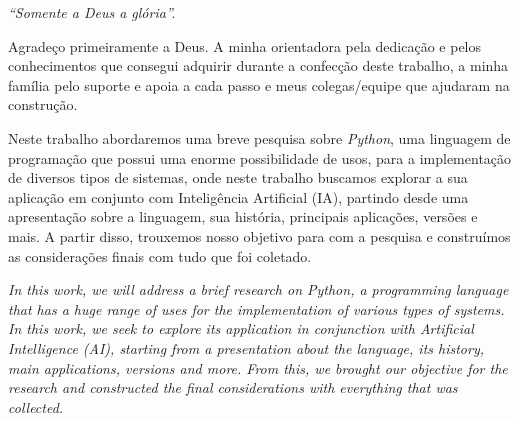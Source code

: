 \begin{flushright}
{\it ``Somente a Deus a gl\'oria''.}
\end{flushright}


\pagebreak



\vspace{1.5cm}

Agradeço primeiramente a Deus. A minha orientadora pela dedicação e pelos conhecimentos que consegui adquirir durante a confecção deste trabalho, a minha família pelo suporte e apoia a cada passo e meus colegas/equipe que ajudaram na construção.

\vspace{0.5cm}

\newpage


\vspace{1.5cm}

Neste trabalho abordaremos uma breve pesquisa sobre \textit{Python}, uma linguagem de programação que possui uma enorme possibilidade de usos, para a implementação de diversos tipos de sistemas, onde neste trabalho buscamos explorar a sua aplicação em conjunto com Inteligência Artificial (IA), partindo desde uma apresentação sobre a linguagem, sua história, principais aplicações, versões e mais. A partir disso, trouxemos nosso objetivo para com a pesquisa e construímos as considerações finais com tudo que foi coletado.

\vspace{0.5cm}


\pagebreak

\thispagestyle{empty}


\vspace{1.5cm}
\textit{In this work, we will address a brief research on Python, a programming language that has a huge range of uses for the implementation of various types of systems. In this work, we seek to explore its application in conjunction with Artificial Intelligence (AI), starting from a presentation about the language, its history, main applications, versions and more. From this, we brought our objective for the research and constructed the final considerations with everything that was collected.}

\vspace{0.5cm}


